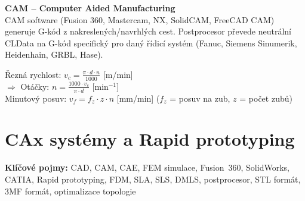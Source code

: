 \documentclass[a4paper,10pt]{article}
\begin{document}
\begin{vysvetlenibox}
\textbf{CAM -- Computer Aided Manufacturing}\\
CAM software (Fusion 360, Mastercam, NX, SolidCAM, FreeCAD CAM) generuje G-kód z nakreslených/navrhlých cest. Postprocesor převede neutrální CLData na G-kód specifický
pro daný řídicí systém (Fanuc, Siemens Sinumerik, Heidenhain, GRBL, Hase).

\begin{vzorcebox}
Řezná rychlost: $v_c = \frac{\pi \cdot d \cdot n}{1000}$ [m/min]\\
$\Rightarrow$ Otáčky: $n = \frac{1000 \cdot v_c}{\pi \cdot d}$ [min$^{-1}$]\\
Minutový posuv: $v_f = f_z \cdot z \cdot n$ [mm/min]
\quad ($f_z$ = posuv na zub, $z$ = počet zubů)
\end{vzorcebox}
\end{vysvetlenibox}



\newpage

\section{CAx systémy a Rapid prototyping}

\begin{pojmybox}
\textbf{Klíčové pojmy:}
CAD, CAM, CAE, FEM simulace, Fusion~360, SolidWorks, CATIA,
Rapid prototyping, FDM, SLA, SLS, DMLS, postprocesor,
STL formát, 3MF formát, optimalizace topologie
\end{pojmybox}
\end{document}
